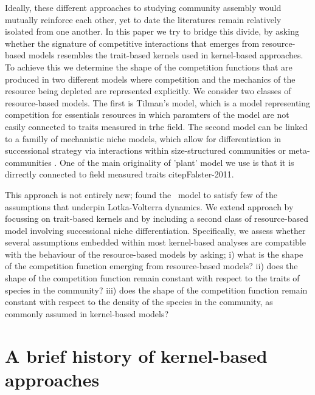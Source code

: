 \documentclass[a4paper,11pt]{article}
\begin{document}
Ideally, these different approaches to studying community assembly
would mutually reinforce each other, yet to date the literatures
remain relatively isolated from one another.
%
In this paper we try to bridge this divide, by asking whether the
signature of competitive interactions that emerges from resource-based
models resembles the trait-based kernels used in kernel-based
approaches.
%
To achieve this we determine the shape of the competition functions
that are produced in two different models where competition and the
mechanics of the resource being depleted are represented explicitly.
We consider two classes of resource-based models. The first is Tilman's
\Rstar model, which is a model representing competition for essentials
resources in which paramters of the model are not easily connected to
traits measured in trhe field.
The second model can be linked to a familly of mechanistic niche models, which allow for
differentiation in successional strategy via interactions within size-structured communities or
meta-communities
\citep{Huston-1987,Kohyama-1993,Moorcroft-2001,Falster-2011}. One of
the main originality of 'plant' model we use is that it is dirrectly
connected to field measured traits citep{Falster-2011}.

%
This approach is not entirely new; \citet{Abrams-2008} found the \Rstar\
model
to satisfy few of the assumptions that underpin Lotka-Volterra
dynamics.
%
We extend \citeauthor{Abrams-2008} approach by focussing on trait-based kernels and
by
including a second class of resource-based model involving
successional niche differentiation.
%
Specifically, we assess whether several assumptions embedded within
most kernel-based analyses are compatible with the behaviour of the
resource-based models by asking;
%
i) what is the shape of the competition function emerging from resource-based
models?
%
ii) does the shape of the competition function remain constant with
respect to the traits of species in the community?
%
iii) does the shape of the competition function remain constant with
respect to the density of the species in the community, as commonly
assumed in kernel-based models?

\section{A brief history of kernel-based approaches}

\end{document}
